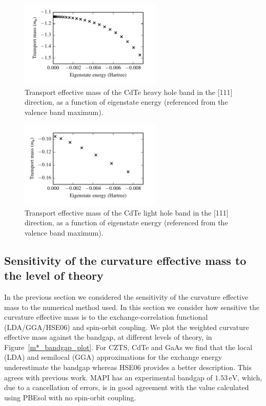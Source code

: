 \begin{figure}[htb] \centering
\includegraphics[width=0.6\textwidth]{./figures/ch4/mt_E_hh.pdf}
\caption[Transport effective mass of the CdTe heavy hole]{\label{mt_E_hh}Transport effective mass of the CdTe heavy hole band in the [111] direction, as a function of eigenstate energy (referenced from the valence band maximum).}
\end{figure}

\begin{figure}[htb] \centering
\includegraphics[width=0.6\textwidth]{./figures/ch4/mt_E_lh.pdf}
\caption[Transport effective mass of the CdTe light hole]{\label{mt_E_lh}Transport effective mass of the CdTe light hole band in the [111] direction, as a function of eigenstate energy (referenced from the valence band maximum).}
\end{figure}

\subsection{Sensitivity of the curvature effective mass to the level of theory}

In the previous section we considered the sensitivity of the curvature effective mass to the numerical method used.
In this section we consider how sensitive the curvature effective mass is to the exchange-correlation functional (LDA/GGA/HSE06) and spin-orbit coupling.
We plot the weighted curvature effective mass against the bandgap, at different levels of theory, in Figure\ \ref{m*_bandgap_plot}. 
For CZTS, CdTe and GaAs we find that the local (LDA) and semilocal (GGA) approximations for the exchange energy underestimate the bandgap whereas HSE06 provides a better description. This agrees with previous work.\autocite{Deak2010,Heyd2003}
MAPI has an experimental bandgap of $1.53\,\mathrm{eV}$,\autocite{Liu2015} which, due to a cancellation of errors, is in good agreement with the value calculated using PBEsol with no spin-orbit coupling. 

